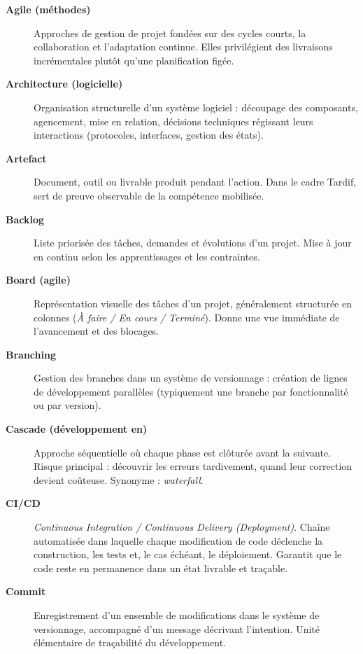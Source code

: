 \begin{description}
  \item[\textbf{Agile (méthodes)}] Approches de gestion de projet fondées sur des cycles courts, la collaboration et l'adaptation continue. Elles privilégient des livraisons incrémentales plutôt qu'une planification figée.

  \item[\textbf{Architecture (logicielle)}] Organisation structurelle d'un système logiciel : découpage des composants, agencement, mise en relation, décisions techniques régissant leurs interactions (protocoles, interfaces, gestion des états).

  \item[\textbf{Artefact}] Document, outil ou livrable produit pendant l'action. Dans le cadre Tardif, sert de preuve observable de la compétence mobilisée.

  \item[\textbf{Backlog}] Liste priorisée des tâches, demandes et évolutions d'un projet. Mise à jour en continu selon les apprentissages et les contraintes.

  \item[\textbf{Board (agile)}] Représentation visuelle des tâches d'un projet, généralement structurée en colonnes (\textit{À faire / En cours / Terminé}). Donne une vue immédiate de l'avancement et des blocages.

  \item[\textbf{Branching}] Gestion des branches dans un système de versionnage : création de lignes de développement parallèles (typiquement une branche par fonctionnalité ou par version).

  \item[\textbf{Cascade (développement en)}] Approche séquentielle où chaque phase est clôturée avant la suivante. Risque principal : découvrir les erreurs tardivement, quand leur correction devient coûteuse. Synonyme : \textit{waterfall}.

  \item[\textbf{CI/CD}] \textit{Continuous Integration / Continuous Delivery (Deployment)}. Chaîne automatisée dans laquelle chaque modification de code déclenche la construction, les tests et, le cas échéant, le déploiement. Garantit que le code reste en permanence dans un état livrable et traçable.

  \item[\textbf{Commit}] Enregistrement d'un ensemble de modifications dans le système de versionnage, accompagné d'un message décrivant l'intention. Unité élémentaire de traçabilité du développement.


\end{description}
